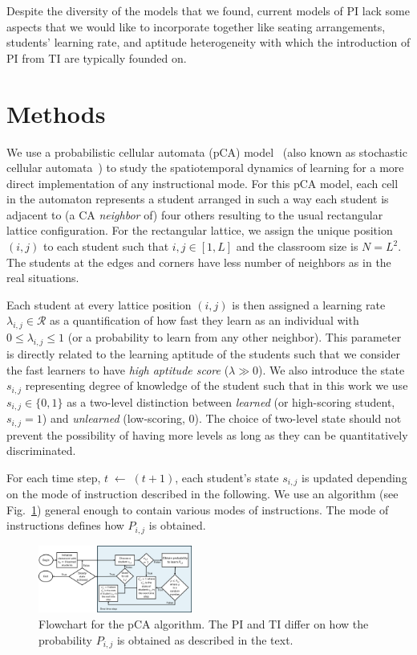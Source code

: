 \documentclass[twocolumn,secnumarabic,amssymb, nobibnotes, aps, prd]{revtex4-2}
\begin{document}
    Despite the diversity of the models that we found, current models of PI lack some aspects that we would like to incorporate together like seating arrangements, students' learning rate, and aptitude heterogeneity with which the introduction of PI from TI are typically founded on.
    
\section{Methods}

    We use a probabilistic cellular automata (pCA) model~\cite{SelfSPP} (also known as stochastic cellular automata~\cite{arciaga2009experimental,Batac2009,louis2018probabilistic,Fernandez2018}) to study the spatiotemporal dynamics of learning for a more direct implementation of any instructional mode.
    For this pCA model, each cell in the automaton represents a student arranged in such a way each student is adjacent to (a CA {\it neighbor} of) four others resulting to the usual rectangular lattice configuration.
    For the rectangular lattice, we assign the unique position $(i,j)$ to each student such that $i,j\in[1,L]$ and the classroom size is $N=L^2$.
    The students at the edges and corners have less number of neighbors as in the real situations.

    Each student at every lattice position $(i,j)$ is then assigned a learning rate
    $\lambda_{i,j} \in \mathcal{R}$ 
    as a quantification of how fast they learn as an individual with
    $0{\leq}\lambda_{i,j}{\leq}1$
    (or a probability to learn from any other neighbor).
    This parameter is directly related to the learning aptitude of the students such that we consider the fast learners to have {\it high aptitude score} ($\lambda{\gg}0$).
    We also introduce the state $s_{i,j}$ representing degree of knowledge of the student such that in this work we use
    $s_{i,j}\in\lbrace{0,1}\rbrace$
    as a two-level distinction between {\it learned} (or high-scoring student, $s_{i,j}=1$) and {\it unlearned} (low-scoring, $0$).
    The choice of two-level state should not prevent the possibility of having more levels as long as they can be quantitatively discriminated.

    For each time step, $t\;{\leftarrow}\;(t+1)$, each student's state $s_{i,j}$ is updated depending on the mode of instruction described in the following.
    We use an algorithm (see Fig.~\ref{fig:pCA-flowchart}) general enough to contain various modes of instructions.
    The mode of instructions defines how $P_{i,j}$ is obtained.
    \begin{figure}[htb]
        \centering
        \includegraphics[width=0.45\textwidth]{figures/2DBPCA Flowchart.png}
        \caption{%
            Flowchart for the pCA algorithm.
            The PI and TI differ on how the probability $P_{i,j}$ is obtained as described in the text.
        }\label{fig:pCA-flowchart}
    \end{figure}
\end{document}
